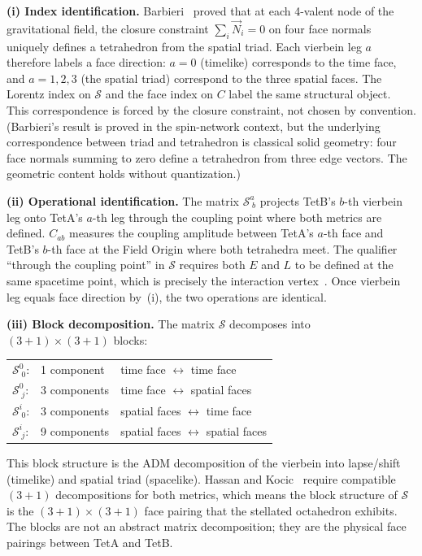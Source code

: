 \documentclass[aps,prd,preprint,superscriptaddress,showpacs,preprintnumbers,amsmath,amssymb,nofootinbib]{revtex4-2}
\begin{document}
\textbf{(i) Index identification.} Barbieri~\cite{barbieri1998} proved that at each 4-valent node of the gravitational field, the closure constraint $\sum_i \vec{N}_i = 0$ on four face normals uniquely defines a tetrahedron from the spatial triad. Each vierbein leg $a$ therefore labels a face direction: $a = 0$ (timelike) corresponds to the time face, and $a = 1,2,3$ (the spatial triad) correspond to the three spatial faces. The Lorentz index on $\mathcal{S}$ and the face index on $C$ label the same structural object. This correspondence is forced by the closure constraint, not chosen by convention. (Barbieri's result is proved in the spin-network context, but the underlying correspondence between triad and tetrahedron is classical solid geometry: four face normals summing to zero define a tetrahedron from three edge vectors. The geometric content holds without quantization.)

\textbf{(ii) Operational identification.} The matrix $\mathcal{S}^a_{\;b}$ projects TetB's $b$-th vierbein leg onto TetA's $a$-th leg through the coupling point where both metrics are defined. $C_{ab}$ measures the coupling amplitude between TetA's $a$-th face and TetB's $b$-th face at the Field Origin where both tetrahedra meet. The qualifier ``through the coupling point'' in $\mathcal{S}$ requires both $E$ and $L$ to be defined at the same spacetime point, which is precisely the interaction vertex~\cite{hinterbichler2012}. Once vierbein leg equals face direction by~(i), the two operations are identical.

\textbf{(iii) Block decomposition.} The matrix $\mathcal{S}$ decomposes into $(3{+}1) \times (3{+}1)$ blocks:
\begin{center}
\renewcommand{\arraystretch}{1.2}
\begin{tabular}{@{}lll@{}}
$\mathcal{S}^0_{\;0}$: & 1 component & time face $\leftrightarrow$ time face \\
$\mathcal{S}^0_{\;j}$: & 3 components & time face $\leftrightarrow$ spatial faces \\
$\mathcal{S}^i_{\;0}$: & 3 components & spatial faces $\leftrightarrow$ time face \\
$\mathcal{S}^i_{\;j}$: & 9 components & spatial faces $\leftrightarrow$ spatial faces \\
\end{tabular}
\end{center}
This block structure is the ADM decomposition of the vierbein into lapse/shift (timelike) and spatial triad (spacelike). Hassan and Kocic~\cite{hassankocic2018} require compatible $(3{+}1)$ decompositions for both metrics, which means the block structure of $\mathcal{S}$ is the $(3{+}1) \times (3{+}1)$ face pairing that the stellated octahedron exhibits. The blocks are not an abstract matrix decomposition; they are the physical face pairings between TetA and TetB.
\end{document}
